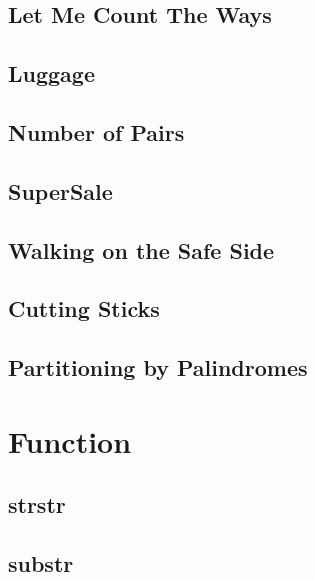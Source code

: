         \subsection{Let Me Count The Ways}
                
        \subsection{Luggage}
                
        \subsection{Number of Pairs}
                
        \subsection{SuperSale}
                
        \subsection{Walking on the Safe Side}
                
        \subsection{Cutting Sticks}
                
        \subsection{Partitioning by Palindromes}
                

\section{Function}
        \subsection{strstr}
                
        \subsection{substr}
                
